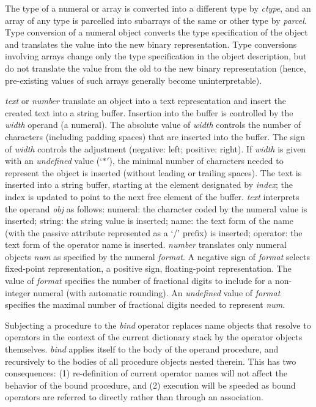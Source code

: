 The  type  of  a  numeral or array is converted  into  a  different  type by \emph{ctype},  and an array of any type is parcelled into subarrays of the same or other type by \emph{parcel}.  Type conversion of a numeral object converts  the type  specification  of the object and translates the value into  the  new binary representation.  Type conversions involving arrays change only  the type  specification in the object description,  but do not  translate  the value from the old to the new binary representation  (hence,  pre-existing values of such arrays generally become uninterpretable).

\emph{text} or \emph{number} translate an object into a text representation and insert the created text into a string buffer. Insertion into the buffer is controlled by the \emph{width} operand (a numeral). The absolute value of \emph{width} controls the number of characters (including padding spaces) that are inserted into the buffer. The sign of \emph{width} controls the adjustment (negative: left; positive: right). If \emph{width} is given with an \emph{undefined} value (`$\ast'$), the minimal number of characters needed to represent the object is inserted (without leading or trailing spaces). The text is inserted into a string buffer, starting at the element designated by \emph{index}; the index is updated to point to the next free element of the buffer. \emph{text} interprets the operand \emph{obj} as follows: numeral: the character coded by the numeral value is inserted; string: the string value is inserted; name: the text form of the name (with the passive attribute represented as a `/' prefix) is inserted; operator: the text form of the operator name is inserted. \emph{number} translates only numeral objects \emph{num} as specified by the numeral \emph{format}. A negative sign of \emph{format} selects fixed-point representation, a positive sign, floating-point representation. The value of \emph{format} specifies the number of fractional digits to include for a non-integer numeral (with automatic rounding). An \emph{undefined} value of \emph{format} specifies the maximal number of fractional digits needed to represent \emph{num}. 

Subjecting  a procedure to the \emph{bind} operator replaces name  objects  that resolve to operators in the context of the current dictionary stack by the operator  objects  themselves. \emph{bind} applies itself to the  body  of  the operand procedure,  and recursively to the bodies of all procedure objects nested therein.  This has two consequences:  (1) re-definition of  current operator  names will not affect the behavior of the bound  procedure,  and (2) execution will be speeded as bound operators are referred to  directly rather than through an association.

